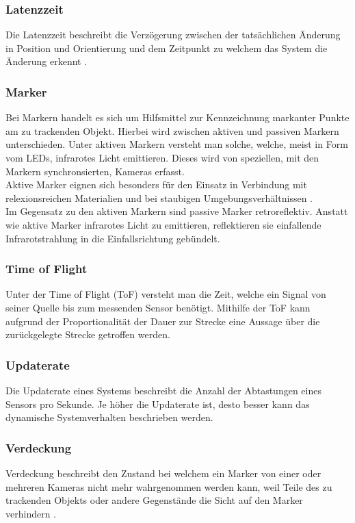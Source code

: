 \subsubsection{Latenzzeit}
Die Latenzzeit beschreibt die Verzögerung zwischen der tatsächlichen Änderung in Position und Orientierung und dem Zeitpunkt zu welchem das System die Änderung erkennt \cite{vr}.
\subsubsection{Marker}
Bei Markern handelt es sich um Hilfsmittel zur Kennzeichnung markanter Punkte am zu trackenden Objekt. Hierbei wird zwischen aktiven und passiven Markern unterschieden.
Unter aktiven Markern versteht man solche, welche, meist in Form vom LEDs, infrarotes Licht emittieren. Dieses wird von speziellen, mit den Markern synchronsierten, Kameras erfasst. \cite{ART}
\\Aktive Marker eignen sich besonders für den Einsatz in Verbindung mit relexionsreichen Materialien und bei staubigen Umgebungsverhältnissen \cite{qualsys_act}.
\\Im Gegensatz zu den aktiven Markern sind passive Marker retroreflektiv. Anstatt wie aktive Marker infrarotes Licht zu emittieren, reflektieren sie einfallende Infrarotstrahlung in die Einfallsrichtung gebündelt. \cite{ART}
\subsubsection{Time of Flight}
Unter der Time of Flight (ToF) versteht man die Zeit, welche ein Signal von seiner Quelle bis zum messenden Sensor benötigt. Mithilfe der ToF kann aufgrund der Proportionalität der Dauer zur Strecke eine Aussage über die zurückgelegte Strecke getroffen werden. \cite{P24}
\subsubsection{Updaterate}
Die Updaterate eines Systems beschreibt die Anzahl der Abtastungen eines Sensors pro Sekunde. Je höher die Updaterate ist, desto besser kann das dynamische Systemverhalten beschrieben werden. \cite{vr}
\subsubsection{Verdeckung}
Verdeckung beschreibt den Zustand bei welchem ein Marker von einer oder mehreren Kameras nicht mehr wahrgenommen werden kann, weil Teile des zu trackenden Objekts oder andere Gegenstände die Sicht auf den Marker verhindern \cite{occlusion}.

